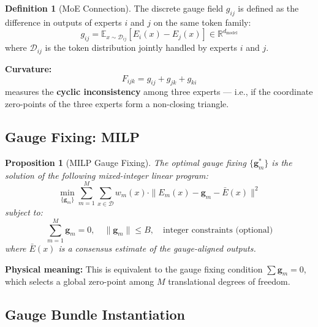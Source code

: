 \documentclass[12pt,a4paper]{article}
\theoremstyle{plain}
\newtheorem{proposition}[theorem]{Proposition}
\theoremstyle{definition}
\newtheorem{definition}[theorem]{Definition}
\newcommand{\R}{\mathbb{R}}
\newcommand{\E}{\mathbb{E}}
\newcommand{\D}{\mathcal{D}}
\begin{document}
\begin{definition}[MoE Connection]
The discrete gauge field $g_{ij}$ is defined as the difference in outputs of experts $i$ and $j$ on the same token family:
\begin{equation}
    g_{ij} = \E_{x \sim \D_{ij}}\left[ E_i(x) - E_j(x) \right] \in \R^{d_{\text{model}}}
\end{equation}
where $\D_{ij}$ is the token distribution jointly handled by experts $i$ and $j$.

\textbf{Curvature:}
\begin{equation}
    F_{ijk} = g_{ij} + g_{jk} + g_{ki}
\end{equation}
measures the \textbf{cyclic inconsistency} among three experts — i.e., if the coordinate zero-points of the three experts form a non-closing triangle.
\end{definition}

\subsection{Gauge Fixing: MILP}

\begin{proposition}[MILP Gauge Fixing]
The optimal gauge fixing $\{\mathbf{g}_m^*\}$ is the solution of the following mixed-integer linear program:
\begin{equation}
    \min_{\{\mathbf{g}_m\}} \sum_{m=1}^{M} \sum_{x \in \D} w_{m}(x) \cdot \|E_m(x) - \mathbf{g}_m - \bar{E}(x)\|^2
\end{equation}
subject to:
\begin{equation}
    \sum_{m=1}^{M} \mathbf{g}_m = 0, \quad \|\mathbf{g}_m\| \leq B, \quad \text{integer constraints (optional)}
\end{equation}
where $\bar{E}(x)$ is a consensus estimate of the gauge-aligned outputs.
\end{proposition}

\textbf{Physical meaning:} This is equivalent to the gauge fixing condition $\sum \mathbf{g}_m = 0$, which selects a global zero-point among $M$ translational degrees of freedom.

\subsection{Gauge Bundle Instantiation}
\end{document}
